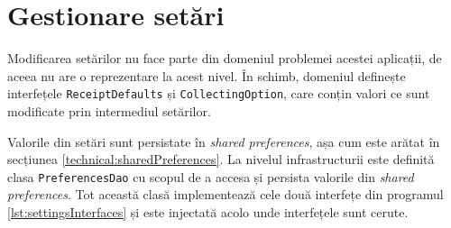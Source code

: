 \section{Gestionare setări}

Modificarea setărilor nu face parte din domeniul problemei acestei aplicații, de aceea nu are o reprezentare la acest nivel. În schimb, domeniul definește interfețele \texttt{ReceiptDefaults} și \texttt{CollectingOption}, care conțin valori ce sunt modificate prin intermediul setărilor.



Valorile din setări sunt persistate în \emph{shared preferences}, așa cum este arătat în secțiunea \ref{technical:sharedPreferences}. La nivelul infrastructurii este definită clasa \texttt{PreferencesDao} cu scopul de a accesa și persista valorile din \emph{shared preferences}. Tot această clasă implementează cele două interfețe din programul \ref{lst:settingsInterfaces} și este injectată acolo unde interfețele sunt cerute.
